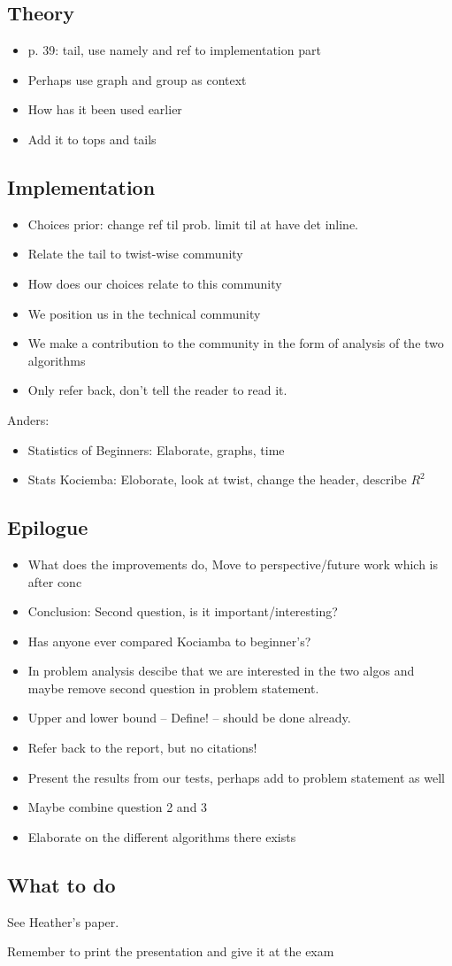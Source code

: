 \subsection{Theory}
\begin{itemize}
	\item p. 39: tail, use namely and ref to implementation part
	\item Perhaps use graph and group as context
	\item How has it been used earlier
	\item Add it to tops and tails
\end{itemize}

\subsection{Implementation}
\begin{itemize}
	\item Choices prior: change ref til prob. limit til at have det inline.
	\item Relate the tail to twist-wise community
	\item How does our choices relate to this community
	\item We position us in the technical community
	\item We make a contribution to the community in the form of analysis of the two algorithms
	\item Only refer back, don't tell the reader to read it.
\end{itemize}

Anders:
\begin{itemize}
	\item Statistics of Beginners: Elaborate, graphs, time
	\item Stats Kociemba: Eloborate, look at twist, change the header, describe $R^2$
\end{itemize}

\subsection{Epilogue}
\begin{itemize}
	\item What does the improvements do, Move to perspective/future work which is after conc
	\item Conclusion: Second question, is it important/interesting?
	\item Has anyone ever compared Kociamba to beginner's?
	\item In problem analysis descibe that we are interested in the two algos and maybe remove second question in problem statement.
	\item Upper and lower bound -- Define! -- should be done already.
	\item Refer back to the report, but no citations!
	\item Present the results from our tests, perhaps add to problem statement as well
	\item Maybe combine question 2 and 3
	\item Elaborate on the different algorithms there exists
\end{itemize}

\subsection{What to do}
See Heather's paper.


Remember to print the presentation and give it at the exam